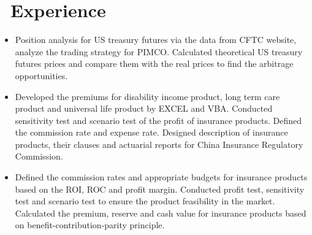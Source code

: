 \documentclass{resume}
\begin{document}
\section{\faGears\ Experience}
\large {}
\begin{itemize}\large
  \item Position analysis for US treasury futures via the data from CFTC website, analyze the trading strategy for PIMCO. Calculated theoretical US treasury futures prices and compare them with the real prices to find the arbitrage opportunities.
\end{itemize}
\large {}
\begin{itemize}\large
  \item Developed the premiums for disability income product, long term care product and universal life product by EXCEL and VBA. Conducted sensitivity test and scenario test of the profit of insurance products. Defined the commission rate and expense rate. Designed description of insurance products, their clauses and actuarial reports for China Insurance Regulatory Commission.
  
  
\end{itemize}

\large {}
\begin{itemize}\large
  \item Defined the commission rates and appropriate budgets for insurance products based on the ROI, ROC and profit margin. Conducted profit test, sensitivity test and scenario test to ensure the product feasibility in the market. Calculated the premium, reserve and cash value for insurance products based on benefit-contribution-parity principle.
    
\end{itemize}
\end{document}
